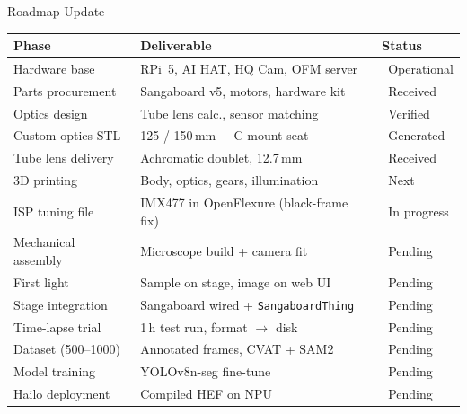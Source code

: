 \documentclass[aspectratio=169,11pt]{beamer}
\newcommand{\done}{{\color{donegreen}\ding{51}}}
\newcommand{\todo}{{\color{unisalzgray}\ding{109}}}
\newcommand{\wip}{{\color{progressamber}\ding{220}}}
\begin{document}
\begin{frame}{Roadmap Update}

  \footnotesize
  \begin{tabular}{@{}lll@{}}
    \toprule
    \textbf{Phase} & \textbf{Deliverable} & \textbf{Status} \\
    \midrule
    Hardware base       & RPi~5, AI HAT, HQ Cam, OFM server         & \done\ Operational \\
    Parts procurement   & Sangaboard v5, motors, hardware kit       & \done\ Received \\
    Optics design       & Tube lens calc., sensor matching          & \done\ Verified \\
    Custom optics STL   & 125 / 150\,mm + C-mount seat              & \done\ Generated \\
    Tube lens delivery  & Achromatic doublet, 12.7\,mm              & \done\ Received \\
    3D printing         & Body, optics, gears, illumination         & \todo\ Next \\
    ISP tuning file     & IMX477 in OpenFlexure (black-frame fix)   & \wip\ In progress \\
    Mechanical assembly & Microscope build + camera fit             & \todo\ Pending \\
    First light         & Sample on stage, image on web UI          & \todo\ Pending \\
    Stage integration   & Sangaboard wired + \texttt{SangaboardThing}& \todo\ Pending \\
    Time-lapse trial    & 1\,h test run, format $\to$ disk          & \todo\ Pending \\
    Dataset (500--1000) & Annotated frames, CVAT + SAM2             & \todo\ Pending \\
    Model training      & YOLOv8n-seg fine-tune                     & \todo\ Pending \\
    Hailo deployment    & Compiled HEF on NPU                       & \todo\ Pending \\
    \bottomrule
  \end{tabular}

\end{frame}
\end{document}
